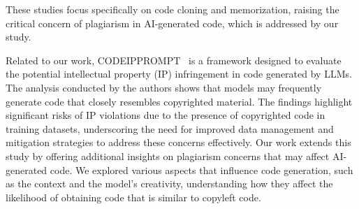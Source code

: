 These studies focus specifically on code cloning and memorization, raising the critical concern of plagiarism in AI-generated code, which is addressed by our study.

Related to our work, {\small \sc CODEIPPROMPT}~\cite{Yu:codeipprompt:ICML:2023} is a framework designed to evaluate the potential intellectual property (IP) infringement in code generated by LLMs. The analysis conducted by the authors shows that models may frequently generate code that closely resembles copyrighted material. The findings highlight significant risks of IP violations due to the presence of copyrighted code in training datasets, underscoring the need for improved data management and mitigation strategies to address these concerns effectively. %
Our work extends this study %
by offering additional insights on plagiarism concerns that may affect AI-generated code. 
We explored various aspects that influence code generation, such as the context and the model's creativity, understanding how they affect the likelihood of obtaining code that is similar to copyleft code. 


